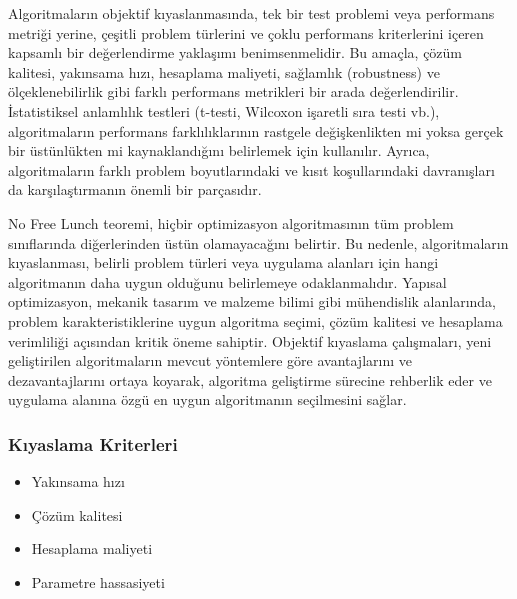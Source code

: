 Algoritmaların objektif kıyaslanmasında, tek bir test problemi veya performans metriği yerine, çeşitli problem türlerini ve çoklu performans kriterlerini içeren kapsamlı bir değerlendirme yaklaşımı benimsenmelidir. Bu amaçla, çözüm kalitesi, yakınsama hızı, hesaplama maliyeti, sağlamlık (robustness) ve ölçeklenebilirlik gibi farklı performans metrikleri bir arada değerlendirilir. İstatistiksel anlamlılık testleri (t-testi, Wilcoxon işaretli sıra testi vb.), algoritmaların performans farklılıklarının rastgele değişkenlikten mi yoksa gerçek bir üstünlükten mi kaynaklandığını belirlemek için kullanılır. Ayrıca, algoritmaların farklı problem boyutlarındaki ve kısıt koşullarındaki davranışları da karşılaştırmanın önemli bir parçasıdır.

No Free Lunch teoremi, hiçbir optimizasyon algoritmasının tüm problem sınıflarında diğerlerinden üstün olamayacağını belirtir. Bu nedenle, algoritmaların kıyaslanması, belirli problem türleri veya uygulama alanları için hangi algoritmanın daha uygun olduğunu belirlemeye odaklanmalıdır. Yapısal optimizasyon, mekanik tasarım ve malzeme bilimi gibi mühendislik alanlarında, problem karakteristiklerine uygun algoritma seçimi, çözüm kalitesi ve hesaplama verimliliği açısından kritik öneme sahiptir. Objektif kıyaslama çalışmaları, yeni geliştirilen algoritmaların mevcut yöntemlere göre avantajlarını ve dezavantajlarını ortaya koyarak, algoritma geliştirme sürecine rehberlik eder ve uygulama alanına özgü en uygun algoritmanın seçilmesini sağlar.


\subsubsection{Kıyaslama Kriterleri}
\begin{itemize}
    \item Yakınsama hızı
    \item Çözüm kalitesi
    \item Hesaplama maliyeti
    \item Parametre hassasiyeti
\end{itemize}

